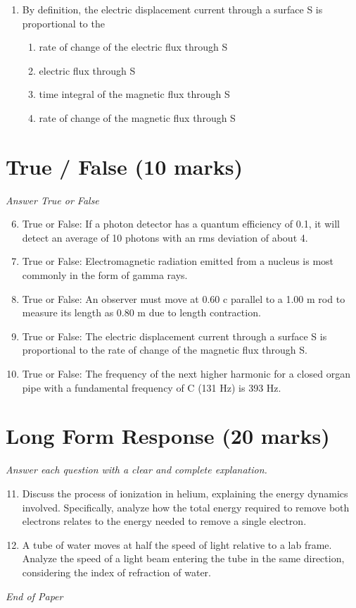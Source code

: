 \documentclass[12pt]{article}
\begin{document}
\begin{enumerate}[label=\arabic*.]
\begin{enumerate}[label=(\alph*)]
    \item kT
    \item (3/2) k T
    \item 3 kT
\end{enumerate}
\item By definition, the electric displacement current through a surface S is proportional to the
\begin{enumerate}[label=(\alph*)]
    \item rate of change of the electric flux through S
    \item electric flux through S
    \item time integral of the magnetic flux through S
    \item rate of change of the magnetic flux through S
\end{enumerate}
\end{enumerate}

\section*{True / False (10 marks)}
\textit{Answer True or False}
\begin{enumerate}[label=\arabic*.]
\setcounter{enumi}{5}
\item True or False: If a photon detector has a quantum efficiency of 0.1, it will detect an average of 10 photons with an rms deviation of about 4.
\item True or False: Electromagnetic radiation emitted from a nucleus is most commonly in the form of gamma rays.
\item True or False: An observer must move at 0.60 c parallel to a 1.00 m rod to measure its length as 0.80 m due to length contraction.
\item True or False: The electric displacement current through a surface S is proportional to the rate of change of the magnetic flux through S.
\item True or False: The frequency of the next higher harmonic for a closed organ pipe with a fundamental frequency of C (131 Hz) is 393 Hz.
\end{enumerate}

\section*{Long Form Response (20 marks)}
\textit{Answer each question with a clear and complete explanation.}
\begin{enumerate}[label=\arabic*.]
\setcounter{enumi}{10}
\item Discuss the process of ionization in helium, explaining the energy dynamics involved. Specifically, analyze how the total energy required to remove both electrons relates to the energy needed to remove a single electron.
\item A tube of water moves at half the speed of light relative to a lab frame. Analyze the speed of a light beam entering the tube in the same direction, considering the index of refraction of water.
\end{enumerate}

\vfill
\noindent\textit{End of Paper}
\end{document}

